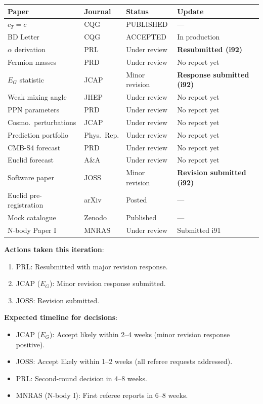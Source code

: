 \documentclass[11pt,a4paper]{article}
\begin{document}
\begin{tcolorbox}[colback=blue!5!white, colframe=dfdblue, title=\textbf{Paper Status Dashboard: i92 (Updated)}]
\begin{longtable}{p{4.5cm}lll}
\toprule
\textbf{Paper} & \textbf{Journal} & \textbf{Status} & \textbf{Update} \\
\midrule
\endhead
$c_T = c$ & CQG & PUBLISHED & --- \\
BD Letter & CQG & ACCEPTED & In production \\
$\alpha$ derivation & PRL & Under review & \textbf{Resubmitted (i92)} \\
Fermion masses & PRD & Under review & No report yet \\
$E_G$ statistic & JCAP & Minor revision & \textbf{Response submitted (i92)} \\
Weak mixing angle & JHEP & Under review & No report yet \\
PPN parameters & PRD & Under review & No report yet \\
Cosmo.\ perturbations & JCAP & Under review & No report yet \\
Prediction portfolio & Phys.\ Rep. & Under review & No report yet \\
CMB-S4 forecast & PRD & Under review & No report yet \\
Euclid forecast & A\&A & Under review & No report yet \\
Software paper & JOSS & Minor revision & \textbf{Revision submitted (i92)} \\
Euclid pre-registration & arXiv & Posted & --- \\
Mock catalogue & Zenodo & Published & --- \\
N-body Paper I & MNRAS & Under review & Submitted i91 \\
\bottomrule
\end{longtable}

\textbf{Actions taken this iteration}:
\begin{enumerate}[nosep]
\item PRL: Resubmitted with major revision response.
\item JCAP ($E_G$): Minor revision response submitted.
\item JOSS: Revision submitted.
\end{enumerate}

\textbf{Expected timeline for decisions}:
\begin{itemize}[nosep]
\item JCAP ($E_G$): Accept likely within 2--4 weeks (minor revision response positive).
\item JOSS: Accept likely within 1--2 weeks (all referee requests addressed).
\item PRL: Second-round decision in 4--8 weeks.
\item MNRAS (N-body I): First referee reports in 6--8 weeks.
\end{itemize}
\end{tcolorbox}
\end{document}
